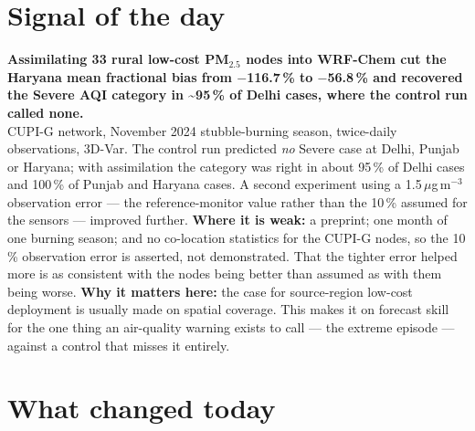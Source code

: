 \documentclass[10pt]{article}
\begin{document}
\vspace{6mm}

\section*{\sffamily\bfseries\color{Deep}Signal of the day}
\vspace{-1.5mm}{\color{Amber}\rule{\linewidth}{1.1pt}}\vspace{2.5mm}

\begin{keybox}
{\sffamily\bfseries\small\color{Deep}Assimilating 33 rural low-cost PM$_{2.5}$ nodes into WRF-Chem cut the Haryana mean fractional bias from $-$116.7\,\% to $-$56.8\,\% and recovered the Severe AQI category in \textasciitilde95\,\% of Delhi cases, where the control run called none.}\\[1.4mm]
\footnotesize
CUPI-G network, November 2024 stubble-burning season, twice-daily observations, 3D-Var. The control run predicted \emph{no} Severe case at Delhi, Punjab or Haryana; with assimilation the category was right in about 95\,\% of Delhi cases and 100\,\% of Punjab and Haryana cases. A second experiment using a 1.5\,$\mu$g\,m$^{-3}$ observation error --- the reference-monitor value rather than the 10\,\% assumed for the sensors --- improved further.
\textbf{Where it is weak:} a preprint; one month of one burning season; and no co-location statistics for the CUPI-G nodes, so the 10\,\% observation error is asserted, not demonstrated. That the tighter error helped more is as consistent with the nodes being better than assumed as with them being worse.
\textbf{Why it matters here:} the case for source-region low-cost deployment is usually made on spatial coverage. This makes it on forecast skill for the one thing an air-quality warning exists to call --- the extreme episode --- against a control that misses it entirely.\par
\end{keybox}

\vspace{3mm}

\section*{\sffamily\bfseries\color{Deep}What changed today}
\vspace{-1.5mm}{\color{Amber}\rule{\linewidth}{1.1pt}}\vspace{2.5mm}
\end{document}
